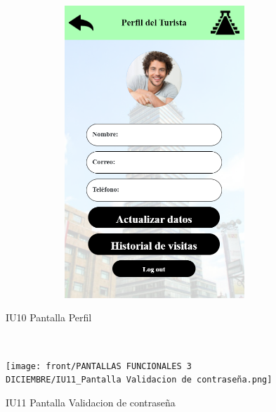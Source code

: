 \begin{figure}[htb]
        \begin{minipage}{1\textwidth}
        \centering
        \includegraphics[width=17cm, height=11cm]{front/PANTALLAS FUNCIONALES 3 DICIEMBRE/IU10_Pantalla Perfil.png}
        \caption{IU10 Pantalla Perfil}
    \end{minipage}%
    \\
        \begin{minipage}{1\textwidth}
        \centering
        \texttt{[image: front/PANTALLAS FUNCIONALES 3 DICIEMBRE/IU11\_Pantalla Validacion de contraseña.png]}
        \caption{IU11 Pantalla Validacion de contraseña}
    \end{minipage}%
\end{figure}

